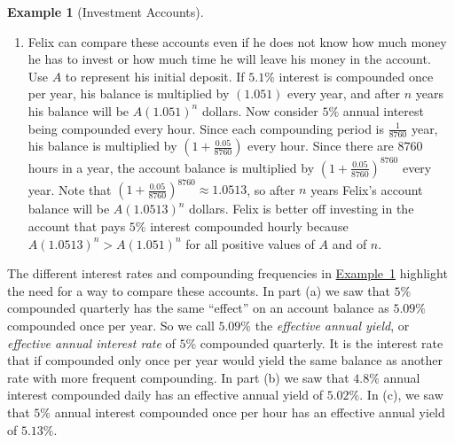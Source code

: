 \documentclass[10pt,]{book}
\theoremstyle{plain}
\theoremstyle{definition}
\theoremstyle{definition}
\newtheorem{example}[theorem]{Example}
\theoremstyle{definition}
\numberwithin{equation}{section}
\begin{document}
\begin{example}[Investment Accounts]
\begin{enumerate}
\item\hypertarget{li-104}{}Felix can compare these accounts even if he does not know how much money he has to invest or how much time he will leave his money in the account.  Use \(A\) to represent his initial deposit.  If \(5.1\%\) interest is compounded once per year, his balance is multiplied by \((1.051)\) every year, and after \(n\) years his balance will be \(A(1.051)^n\) dollars. Now consider \(5\%\) annual interest being compounded every hour.  Since each compounding period is \(\frac{1}{8760}\) year, his balance is multiplied by \((1+\frac{0.05}{8760})\) every hour. Since there are \(8760\) hours in a year, the account balance is multiplied by \((1+\frac{0.05}{8760})^{8760}\) every year. Note that \((1 + \frac{0.05}{8760} )^{8760} \approx 1.0513\), so after \(n\) years Felix’s account balance will be \(A(1.0513)^n\) dollars. Felix is better off investing in the account that pays \(5\%\) interest compounded hourly because \(A(1.0513)^n > A(1.051)^n\) for all positive values of \(A\) and of \(n\).%
\end{enumerate}
\end{example}
\hypertarget{p-205}{}%
The different interest rates and compounding frequencies in \hyperref[chapter04-section05-investment-accounts]{Example~1} highlight the need for a way to compare these accounts. In part (a) we saw that \(5\%\) compounded quarterly has the same “effect” on an account balance as \(5.09\%\) compounded once per year. So we call \(5.09\%\) the \emph{effective annual yield}, or \emph{effective annual interest rate} of \(5\%\) compounded quarterly.  It is the interest rate that if compounded only once per year would yield the same balance as another rate with more frequent compounding. In part (b) we saw that \(4.8\%\) annual interest compounded daily has an effective annual yield of \(5.02\%\). In (c), we saw that \(5\%\) annual interest compounded once per hour has an effective annual yield of \(5.13\%\).%
\typeout{************************************************}
\typeout{************************************************}
\end{document}
